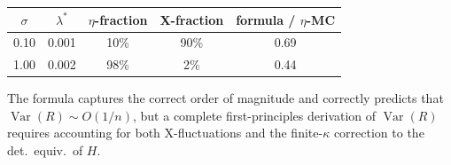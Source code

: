 \begin{center}
\begin{tabular}{ccccc}
\hline
$\sigma$ & $\lambda^{*}$ & $\eta$-fraction & X-fraction & formula / $\eta$-MC \\
\hline
0.10 & 0.001 & 10\% & 90\% & 0.69 \\
1.00 & 0.002 & 98\% & 2\%  & 0.44 \\
\hline
\end{tabular}
\end{center}

The formula captures the correct order of magnitude and correctly predicts
that $\operatorname{Var}(R)\sim O(1/n)$, but a complete first-principles
derivation of $\operatorname{Var}(R)$ requires accounting for both
X-fluctuations and the finite-$\kappa$ correction to the det.\ equiv.\
of $H$.
